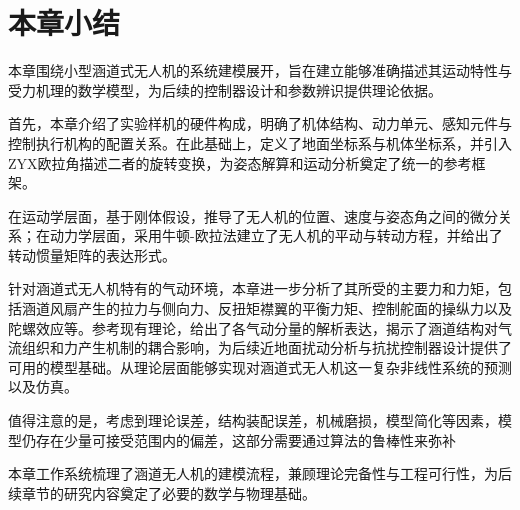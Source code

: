 \section{本章小结}
本章围绕小型涵道式无人机的系统建模展开，旨在建立能够准确描述其运动特性与受力机理的数学模型，为后续的控制器设计和参数辨识提供理论依据。

首先，本章介绍了实验样机的硬件构成，明确了机体结构、动力单元、感知元件与控制执行机构的配置关系。在此基础上，定义了地面坐标系与机体坐标系，并引入ZYX欧拉角描述二者的旋转变换，为姿态解算和运动分析奠定了统一的参考框架。

在运动学层面，基于刚体假设，推导了无人机的位置、速度与姿态角之间的微分关系；在动力学层面，采用牛顿-欧拉法建立了无人机的平动与转动方程，并给出了转动惯量矩阵的表达形式。

针对涵道式无人机特有的气动环境，本章进一步分析了其所受的主要力和力矩，包括涵道风扇产生的拉力与侧向力、反扭矩襟翼的平衡力矩、控制舵面的操纵力以及陀螺效应等。参考现有理论，给出了各气动分量的解析表达，揭示了涵道结构对气流组织和力产生机制的耦合影响，为后续近地面扰动分析与抗扰控制器设计提供了可用的模型基础。从理论层面能够实现对涵道式无人机这一复杂非线性系统的预测以及仿真。

值得注意的是，考虑到理论误差，结构装配误差，机械磨损，模型简化等因素，模型仍存在少量可接受范围内的偏差，这部分需要通过算法的鲁棒性来弥补

本章工作系统梳理了涵道无人机的建模流程，兼顾理论完备性与工程可行性，为后续章节的研究内容奠定了必要的数学与物理基础。
